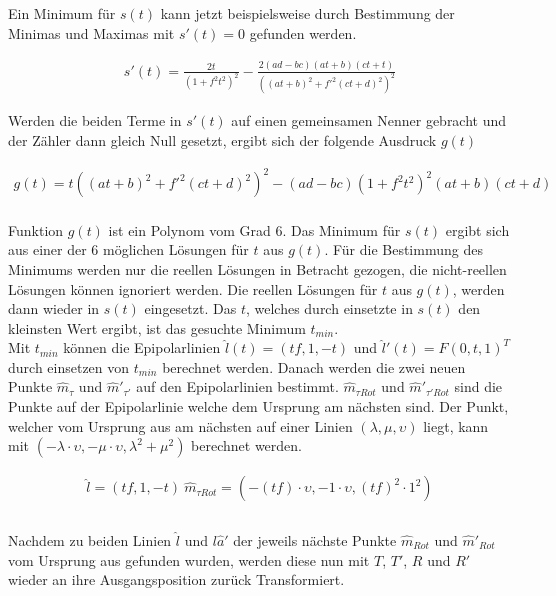 Ein Minimum für $s(t)$ kann jetzt beispielsweise durch Bestimmung der Minimas und Maximas mit $s'(t) = 0$ gefunden werden. 

\begin{gather}
	s'(t) = \frac{2t}{(1+f^2t^2)^2} - \frac{2(ad-bc)(at+b)(ct+t)}{((at+b)^2+f'^2(ct+d)^2)^2}
\end{gather}

Werden die beiden Terme in $s'(t)$ auf einen gemeinsamen Nenner gebracht und der Zähler dann gleich Null gesetzt, ergibt sich der folgende Ausdruck $g(t)$

\begin{gather}
	g(t) = t((at+b)^2+f'^2(ct+d)^2)^2-(ad-bc)(1+f^2t^2)^2(at+b)(ct+d)
\end{gather}\\

Funktion $g(t)$ ist ein Polynom vom Grad 6. Das Minimum für $s(t)$ ergibt sich aus einer der 6 möglichen Lösungen für $t$ aus $g(t)$. Für die Bestimmung des Minimums werden nur die reellen Lösungen in Betracht gezogen, die nicht-reellen Lösungen können ignoriert werden. Die reellen Lösungen für $t$ aus $g(t)$, werden dann wieder in $s(t)$ eingesetzt. Das $t$, welches durch einsetzte in $s(t)$ den kleinsten Wert ergibt, ist das gesuchte Minimum $t_{min}$. \\

Mit $t_{min}$ können die Epipolarlinien $\hat{l}(t)=(tf,1,-t)$ und $\hat{l}'(t) = F(0,t,1)^T$ durch einsetzen von $t_{min}$ berechnet werden. Danach werden die zwei neuen Punkte $\hat{m}_{\tau}$ und $\hat{m}'_{\tau'}$ auf den Epipolarlinien bestimmt. $\hat{m}_{\tau Rot}$ und $\hat{m}'_{\tau' Rot}$ sind die Punkte auf der Epipolarlinie welche dem Ursprung am nächsten sind. Der Punkt, welcher vom Ursprung aus am nächsten auf einer Linien $(\lambda, \mu,\upsilon)$ liegt, kann mit $(-\lambda \cdot \upsilon, -\mu \cdot \upsilon, \lambda^2+ \mu^2)$ berechnet werden.

\begin{gather}
	\hat{l} = (tf, 1, -t)\
	\hat{m}_{\tau Rot} = (-(tf) \cdot \upsilon , - 1 \cdot \upsilon, (tf)^2 \cdot 1^2 )\\
\end{gather}\\
 
Nachdem zu beiden Linien $\hat{l}$ und $l\hat{a}'$ der jeweils nächste Punkte $\hat{m}_{Rot}$ und $\hat{m}'_{Rot}$ vom Ursprung aus gefunden wurden, werden diese nun mit $T$, $T'$, $R$ und $R'$ wieder an ihre Ausgangsposition zurück Transformiert. 

